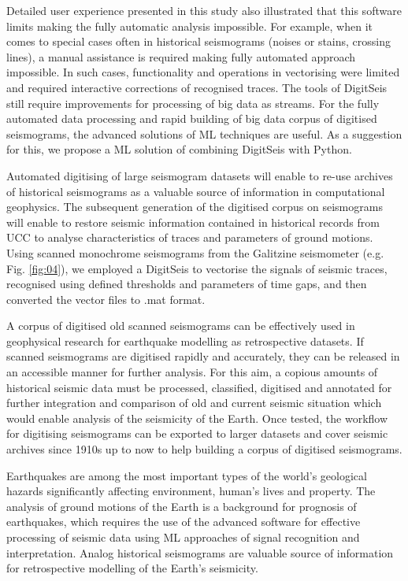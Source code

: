 \documentclass[sensors,article,submit,moreauthors,pdftex]{Definitions/mdpi}
\begin{document}
Detailed user experience presented in this study also illustrated that this software limits making the fully automatic analysis impossible. For example, when it comes to special cases often in historical seismograms (noises or stains, crossing lines), a manual assistance is required making fully automated approach impossible. In such cases, functionality and operations in vectorising were limited and required interactive corrections of recognised traces. The tools of DigitSeis still require improvements for processing of big data as streams. For the fully automated data processing and rapid building of big data corpus of digitised seismograms, the advanced solutions of \ac{ML} techniques are useful. As a suggestion for this, we propose a \ac{ML} solution of combining DigitSeis with Python. 

Automated digitising of large seismogram datasets will enable to re-use archives of historical seismograms as a valuable source of information in computational geophysics. The subsequent generation of the digitised corpus on seismograms will enable to restore seismic information contained in historical records from \ac{UCC} to analyse characteristics of traces and parameters of ground motions. Using scanned monochrome seismograms from the Galitzine seismometer (e.g. Fig. \ref{fig:04}), we employed a DigitSeis to vectorise the signals of seismic traces, recognised using defined thresholds and parameters of time gaps, and then converted the vector files to .mat format.  

A corpus of digitised old scanned seismograms can be effectively used in geophysical research for earthquake modelling as retrospective datasets. If scanned seismograms are digitised rapidly and accurately, they can be released in an accessible manner for further analysis. For this aim, a copious amounts of historical seismic data must be processed, classified, digitised and annotated for further integration and comparison of old and current seismic situation which would enable analysis of the seismicity of the Earth. Once tested, the workflow for digitising seismograms can be exported to larger datasets and cover seismic archives since 1910s up to now to help building a corpus of digitised seismograms. 

Earthquakes are among the most important types of the world's geological hazards significantly affecting environment, human's lives and property. The analysis of ground motions of the Earth is a background for prognosis of earthquakes, which requires the use of the advanced software for effective processing of seismic data using \ac{ML} approaches of signal recognition and interpretation. Analog historical seismograms are valuable source of information for retrospective modelling of the Earth's seismicity. 
\end{document}
